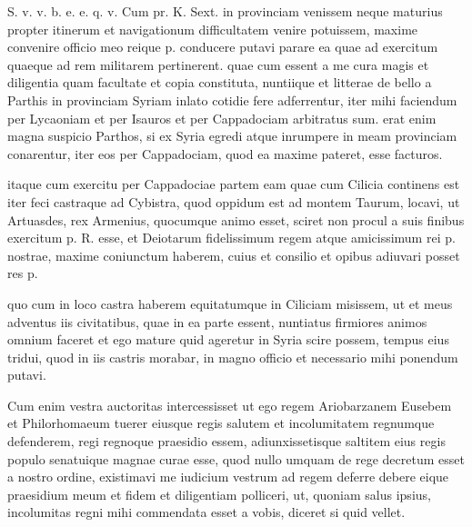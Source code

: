 


 S. v. v. b. e. e. q. v. Cum pr. K. Sext. in provinciam venissem neque maturius propter itinerum et navigationum difficultatem venire potuissem, maxime convenire officio meo reique p. conducere putavi parare ea quae ad exercitum quaeque ad rem militarem pertinerent. quae cum essent a me cura magis et diligentia quam facultate et copia constituta, nuntiique et litterae de bello a Parthis in provinciam Syriam inlato cotidie fere adferrentur, iter mihi faciendum per Lycaoniam et per Isauros et per Cappadociam arbitratus sum. erat enim magna suspicio Parthos, si ex Syria egredi atque inrumpere in meam provinciam conarentur, iter eos per Cappadociam, quod ea maxime pateret, esse facturos.

 itaque cum exercitu per Cappadociae partem eam quae cum Cilicia continens est iter feci castraque ad Cybistra, quod oppidum est ad montem Taurum, locavi, ut Artuasdes, rex Armenius, quocumque animo esset, sciret non procul a suis finibus exercitum p. R. esse, et Deiotarum fidelissimum regem atque amicissimum rei p. nostrae, maxime coniunctum haberem, cuius et consilio et opibus adiuvari posset res p.

 quo cum in loco castra haberem equitatumque in Ciliciam misissem, ut et meus adventus iis civitatibus, quae in ea parte essent, nuntiatus firmiores animos omnium faceret et ego mature quid ageretur in Syria scire possem, tempus eius tridui, quod in iis castris morabar, in magno officio et necessario mihi ponendum putavi.

 Cum enim vestra auctoritas intercessisset ut ego regem Ariobarzanem Eusebem et Philorhomaeum tuerer eiusque regis salutem et incolumitatem regnumque defenderem, regi regnoque praesidio essem, adiunxissetisque saltitem eius regis populo senatuique magnae curae esse, quod nullo umquam de rege decretum esset a nostro ordine, existimavi me iudicium vestrum ad regem deferre debere eique praesidium meum et fidem et diligentiam polliceri, ut, quoniam salus ipsius, incolumitas regni mihi commendata esset a vobis, diceret si quid vellet.

